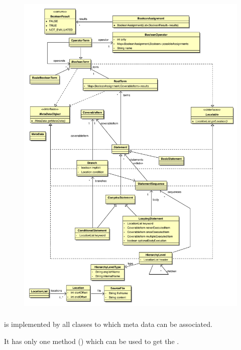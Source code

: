 \begin{figure}[hbtp]
 \centering
 \includegraphics[height=\textheight]{images/Model/ast.pdf}
 \caption{}
 \label{figure:Classes:Model:AST}
\end{figure}


\subsubsection[MetaDataObject]{}

 is implemented by all classes to which meta data can be
associated.

It has only one method () which can be used to get the
.

